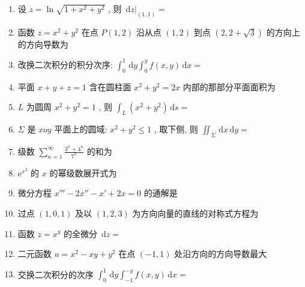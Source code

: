 \documentclass[cn,11pt,fancy,hide]{elegantbook}
\newcommand{\ee}{\mathrm{e}}
\newcommand{\dd}{\,\mathrm{d}}
\renewcommand{\leq}{\leqslant}
\begin{document}
\begin{enumerate}
	\item 设 $z=\ln \sqrt{1+x^{2}+y^{2}}$ , 则 $\dd\left.z\right|_{(1,1)}=$\underline{\hspace{8pc}}
	
	\item 函数 $z=x^{2}+y^{2}$ 在点 $P(1,2)$ 沿从点 $(1,2)$ 到点 $(2,2+\sqrt{3})$ 的方向上的方向导数为\underline{\hspace{8pc}}
	
	\item 改换二次积分的积分次序: $\int_{0}^{1} \dd y \int_{0}^{y} f(x, y) \dd x=$\underline{\hspace{8pc}}
	
	\item 平面 $x+y+z=1$ 含在圆柱面 $x^{2}+y^{2}=2 x$ 内部的那部分平面面积为\underline{\hspace{8pc}}
	
	\item $L$ 为圆周 $x^{2}+y^{2}=1$ , 则 $\int_{L}\left(x^{2}+y^{2}\right) \dd s=$\underline{\hspace{8pc}}
	
	\item $\Sigma$ 是 $xoy$ 平面上的圆域: $x^{2}+y^{2} \leq 1$ , 取下侧, 则 $\iint_{\Sigma} \dd x \dd y=$\underline{\hspace{8pc}}
	
	\item 级数 $\sum_{n=1}^{\infty} \frac{3^{n}+4^{n}}{7^{n}}$ 的和为\underline{\hspace{8pc}}
	
	\item $\ee^{x^{2}}$ 的 $x$ 的幂级数展开式为\underline{\hspace{8pc}}
	
	\item 微分方程 $x'''-2x''-x'+2x=0$ 的通解是\underline{\hspace{8pc}}

	\item 过点 $(1,0,1)$ 及以 $(1,2,3)$ 为方向向量的直线的对称式方程为\underline{\hspace{8pc}}
	
	\item 函数 $z=x^y$ 的全微分 $\dd z=$\underline{\hspace{8pc}}
	
	\item 二元函数 $u=x^{2}-x y+y^{2}$ 在点 $(-1,1)$ 处沿方向\underline{\hspace{8pc}}的方向导数最大
	
	\item 交换二次积分的次序 $\int_0^1 \dd y\int_{-1}^{-y} f(x,y)\dd x=$\underline{\hspace{8pc}}
	

\end{enumerate}
\end{document}
